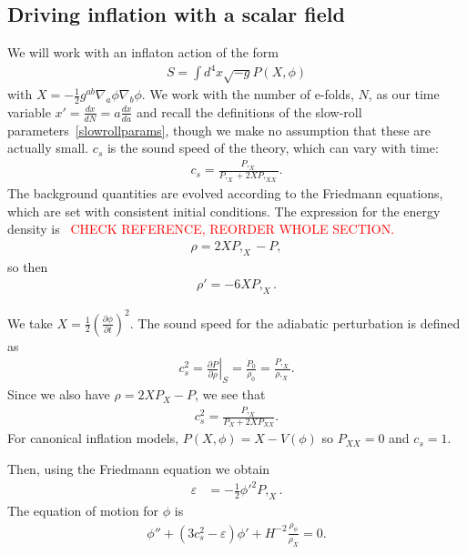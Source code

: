     \subsection{Driving inflation with a scalar field}
We will work with an inflaton action of the form
\begin{align}
S = \int d^4x \sqrt{-g}P(X,\phi)
\end{align}
with $X=-\frac{1}{2}g^{ab}\nabla_a \phi\nabla_b \phi$.
We work with the number of e-folds, $N$, as our time variable
$x'=\frac{dx}{dN}=a\frac{dx}{da}$
and recall the definitions of the slow-roll parameters~\eqref{slowrollparams},
though we make no assumption that these are actually small.
$c_s$ is the sound speed of the theory, which can vary with time:
\begin{align}
c_s=\frac{P,_X}{P,_X+2XP,_{XX}}.
\end{align}
The background quantities are evolved according to the Friedmann equations,
which are set with consistent initial conditions.
The expression for the energy density is~\cite{Christopherson_2009}
\textcolor{red}{CHECK REFERENCE, REORDER WHOLE SECTION.}
\begin{align}
    \rho = 2XP,_X-P,
\end{align}
so then
\begin{align}
    \rho' = -6XP,_X.
\end{align}


    We take $X=\frac{1}{2}\left(\frac{\partial\phi}{\partial t}\right)^2$.
    The sound speed for the adiabatic perturbation is defined as
    \begin{align}\label{sound_speed_definition}
        c_s^2 = \left. \frac{\partial P}{\partial \rho} \right|_S = \frac{\dot{P}_0}{\dot{\rho}_0}
        = \frac{P,_X}{\rho,_X}.
    \end{align}
    Since we also have $\rho=2X P_X-P$, we see that
    \begin{align}
        c_s^2 = \frac{P,_X}{P_X+2X P_{XX}}.
    \end{align}
    For canonical inflation models, $P(X,\phi)=X-V(\phi)$
    so $P_{XX}=0$ and $c_s=1$.


Then, using the Friedmann equation we obtain
\begin{align}\label{PXepsilon}
    \varepsilon &= -\frac{1}{2}{\phi'}^2P,_X.
\end{align}
The equation of motion for $\phi$ is~\cite{Hu_2011}
\begin{align}\label{phieom}
    \phi''+(3c_s^2-\varepsilon)\phi'+H^{-2}\frac{\rho_\phi}{\rho_X}=0.
\end{align}


